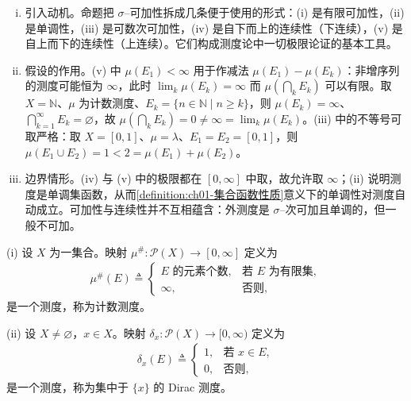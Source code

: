 \documentclass[../../main.tex]{subfiles}%
\begin{document}
\begin{remark}\label{remark:ch01-测度性质注}
\begin{enumerate}[(i)]
\item 引入动机。命题把 $\sigma$--可加性拆成几条便于使用的形式：(i) 是有限可加性，(ii) 是单调性，(iii) 是可数次可加性，(iv) 是自下而上的连续性（下连续），(v) 是自上而下的连续性（上连续）。它们构成测度论中一切极限论证的基本工具。
\item 假设的作用。(v) 中 $\mu(E_1)<\infty$ 用于作减法 $\mu(E_1)-\mu(E_k)$：非增序列的测度可能恒为 $\infty$，此时 $\lim_k\mu(E_k)=\infty$ 而 $\mu\left(\bigcap_kE_k\right)$ 可以有限。取 $X=\mathbb{N}$、$\mu$ 为计数测度、$E_k=\{n\in\mathbb{N}\mid n\geqslant k\}$，则 $\mu(E_k)=\infty$、$\bigcap_{k=1}^\infty E_k=\varnothing$，故 $\mu\left(\bigcap_kE_k\right)=0\neq\infty=\lim_k\mu(E_k)$。(iii) 中的不等号可取严格：取 $X=[0,1]$、$\mu=\lambda$、$E_1=E_2=[0,1]$，则 $\mu(E_1\cup E_2)=1<2=\mu(E_1)+\mu(E_2)$。
\item 边界情形。(iv) 与 (v) 中的极限都在 $[0,\infty]$ 中取，故允许取 $\infty$；(ii) 说明测度是单调集函数，从而\cref{definition:ch01-集合函数性质}意义下的单调性对测度自动成立。可加性与连续性并不互相蕴含：外测度是 $\sigma$--次可加且单调的，但一般不可加。
\end{enumerate}
\end{remark}

\begin{example}\label{example:ch01-计数与Dirac}
(i) 设 $X$ 为一集合。映射 $\mu^\#:\mathcal{P}(X)\to[0,\infty]$ 定义为
\begin{align*}
\mu^\#(E)\triangleq
\begin{cases}
E\text{ 的元素个数}, & \text{若 }E\text{ 为有限集},\\
\infty, & \text{否则},
\end{cases}
\end{align*}
是一个测度，称为计数测度。

(ii) 设 $X\neq\varnothing$，$x\in X$。映射 $\delta_x:\mathcal{P}(X)\to[0,\infty)$ 定义为
\begin{align*}
\delta_x(E)\triangleq
\begin{cases}
1, & \text{若 }x\in E,\\
0, & \text{否则},
\end{cases}
\end{align*}
是一个测度，称为集中于 $\{x\}$ 的 Dirac 测度。
\end{example}
\end{document}
